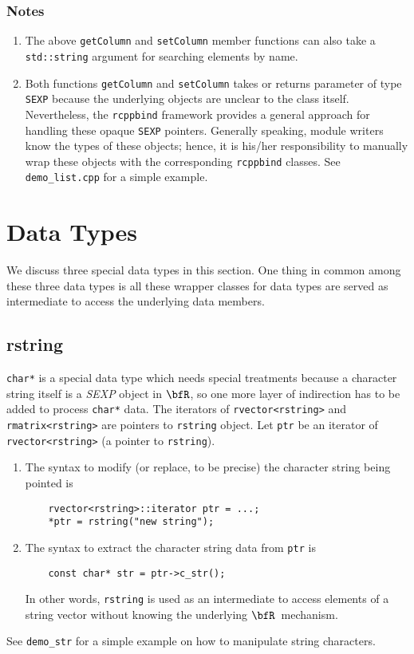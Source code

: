 \documentclass{article}
\newcommand{\R}{$\bfR$}
\begin{document}
\subsubsection*{Notes}
\begin{enumerate}
  \item The above \texttt{getColumn} and \texttt{setColumn}
    member functions can also take a \texttt{std::string}
    argument for searching elements by name.
  \item Both functions \texttt{getColumn} and
    \texttt{setColumn} takes or returns parameter of type
    \texttt{SEXP} because the underlying objects are unclear
    to the class itself.  Nevertheless, the \texttt{rcppbind}
    framework provides a general approach for handling these
    opaque \texttt{SEXP} pointers. Generally speaking,
    module writers know the types of these objects; hence, it
    is his/her responsibility to manually wrap these objects
    with the corresponding \texttt{rcppbind} classes. See
    \texttt{demo\_list.cpp} for a simple example.
\end{enumerate}

\section{Data Types}\label{sec:datatypes}

We discuss three special data types in this section. One
thing in common among these three data types is all these
wrapper classes for data types are served as intermediate to
access the underlying data members.

\subsection{rstring}

\texttt{char*} is a special data type which needs special
treatments because a character string itself is a
\textsl{SEXP} object in \R, so one more layer of indirection
has to be added to process \texttt{char*} data. The iterators
of \texttt{rvector<rstring>} and \texttt{rmatrix<rstring>}
are pointers to \texttt{rstring} object. Let \texttt{ptr} be
an iterator of \texttt{rvector<rstring>} (a pointer to
\texttt{rstring}). 
\begin{enumerate}
  \item The syntax to modify (or replace, to be precise) the
    character string being pointed is
    \begin{lstlisting}
    rvector<rstring>::iterator ptr = ...;
    *ptr = rstring("new string");
    \end{lstlisting}
  \item The syntax to extract the character string data from
    \texttt{ptr} is
    \begin{lstlisting}
    const char* str = ptr->c_str();
    \end{lstlisting}
    In other words, \texttt{rstring} is used as an
    intermediate to access elements of a string vector
    without knowing the underlying \R\ mechanism.
\end{enumerate}
See \texttt{demo\_str} for a simple example on how to
manipulate string characters.
\end{document}
